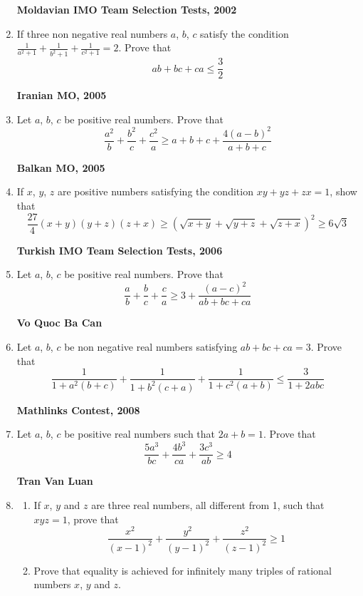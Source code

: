 \documentclass{article}
\begin{document}
\begin{enumerate}
\begin {flushright}
\textbf{Moldavian IMO Team Selection Tests, 2002}
\end{flushright}
\item If three non negative real numbers $a $, $b $, $c $ satisfy the condition  $\displaystyle{\frac {1}{a^2+1}+\frac {1}{b^2+1}+\frac {1}{c^2+1}=2}$. Prove that  $$ab+bc+ca \leq \frac{3}{2}$$
\begin {flushright}
\textbf{Iranian MO, 2005}
\end{flushright}
\item Let $a$, $b$, $c$ be positive real numbers. Prove that  $$\frac {a^2}{b}+ \frac {b^2}{c}+ \frac {c^2}{a} \geq a+b+c+ \frac {4 (a-b)^2}{a+b+c}$$
\begin {flushright}
\textbf{Balkan MO, 2005}
\end{flushright}
\item If $x $, $y $, $z $ are positive numbers satisfying the condition  $xy+yz+zx=1$, show that  $$\frac {27}{4}(x+y)(y+z)(z+x)\geq \left (\sqrt {x+y}+\sqrt {y+z} + \sqrt {z+x} \right)^2\geq 6\sqrt {3}$$
\begin {flushright}
\textbf{Turkish IMO Team Selection Tests, 2006}
\end{flushright}
\item Let $a$, $b$, $c$ be positive real numbers. Prove that  $$\frac {a}{b}+\frac {b}{c}+\frac {c}{a} \geq 3+ \frac {(a-c)^2}{ab+bc+ca}$$
\begin {flushright}
\textbf {Vo Quoc Ba Can}
\end {flushright}
\item Let $a$, $b$, $c$ be non negative real numbers satisfying  $ab+bc+ca=3$. Prove that  $$\frac {1}{1+a^2 (b+c)}+\frac {1}{1+b^2 (c+a)}+\frac {1}{1+c^2 (a+b)}\leq \frac {3}{1+2abc}$$
\begin {flushright}
\textbf{Mathlinks Contest, 2008}
\end{flushright}
\item Let $a$, $b$, $c$ be positive real numbers such that $2a+b=1$. Prove that $$\frac{5a^3}{bc}+\frac{4b^3}{ca} +\frac{3c^3}{ab} \geq 4$$
\begin {flushright}
\textbf {Tran Van Luan}
\end {flushright}
\item \begin {enumerate}
      \item If $x $, $y $ and $z $ are three real numbers, all different from 1, such that  $xyz=1$, prove that  $$\frac {x^2}{(x-1)^2}+ \frac{y^2}{(y-1)^2}+\frac {z^2}{(z-1)^2}\geq 1$$
      \item Prove that equality is achieved for infinitely many triples of rational numbers $x $, $y $ and $z $.

\end{enumerate}
\end{enumerate}
\end{document}
